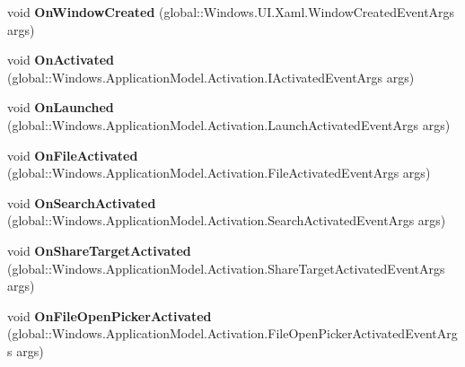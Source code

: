 \begin{DoxyCompactItemize}
void {\bfseries On\+Window\+Created} (global\+::\+Windows.\+U\+I.\+Xaml.\+Window\+Created\+Event\+Args args)
\item 
\mbox{\label{interface_windows_1_1_u_i_1_1_xaml_1_1_i_application_overrides_a3d67b84df0aa6c2353ba9dfdf0711d43}} 
void {\bfseries On\+Activated} (global\+::\+Windows.\+Application\+Model.\+Activation.\+I\+Activated\+Event\+Args args)
\item 
\mbox{\label{interface_windows_1_1_u_i_1_1_xaml_1_1_i_application_overrides_ab33b8fe098161d6f117c096208d4caa4}} 
void {\bfseries On\+Launched} (global\+::\+Windows.\+Application\+Model.\+Activation.\+Launch\+Activated\+Event\+Args args)
\item 
\mbox{\label{interface_windows_1_1_u_i_1_1_xaml_1_1_i_application_overrides_a9e67cc475338afb3d85b18949e08b15f}} 
void {\bfseries On\+File\+Activated} (global\+::\+Windows.\+Application\+Model.\+Activation.\+File\+Activated\+Event\+Args args)
\item 
\mbox{\label{interface_windows_1_1_u_i_1_1_xaml_1_1_i_application_overrides_aa8ed1fee4ec2b422d17e20f81f1d7c31}} 
void {\bfseries On\+Search\+Activated} (global\+::\+Windows.\+Application\+Model.\+Activation.\+Search\+Activated\+Event\+Args args)
\item 
\mbox{\label{interface_windows_1_1_u_i_1_1_xaml_1_1_i_application_overrides_aae46c198cf7ea67cfcbf175e03b9c9d6}} 
void {\bfseries On\+Share\+Target\+Activated} (global\+::\+Windows.\+Application\+Model.\+Activation.\+Share\+Target\+Activated\+Event\+Args args)
\item 
\mbox{\label{interface_windows_1_1_u_i_1_1_xaml_1_1_i_application_overrides_a9936f8d6d560846bd8afcc2caf52f817}} 
void {\bfseries On\+File\+Open\+Picker\+Activated} (global\+::\+Windows.\+Application\+Model.\+Activation.\+File\+Open\+Picker\+Activated\+Event\+Args args)
\item 
\mbox{\label{interface_windows_1_1_u_i_1_1_xaml_1_1_i_application_overrides_ac1045282cb352835c663f00f47f545c0}} 

\end{DoxyCompactItemize}
